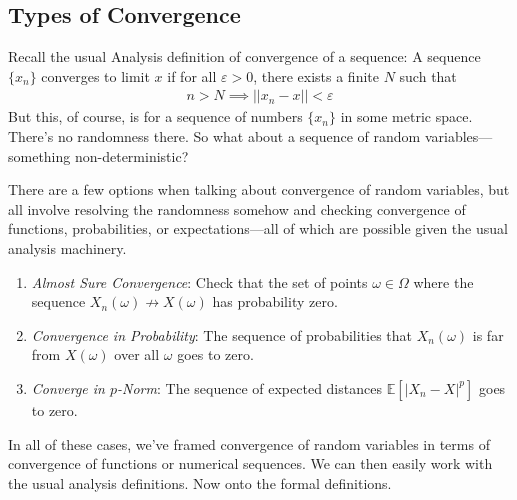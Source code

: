 \documentclass[12pt]{article}
\theoremstyle{plain}
\theoremstyle{definition}
\theoremstyle{remark}
\newcommand{\ra}{\rightarrow}
\newcommand{\E}{\mathbb{E}}
\begin{document}
\subsection{Types of Convergence}

Recall the usual Analysis definition of convergence of a sequence: A
sequence $\{x_n\}$ converges to limit $x$ if for all $\varepsilon> 0$,
there exists a finite $N$ such that
\begin{align*}
  n > N \implies ||x_n - x|| < \varepsilon
\end{align*}
But this, of course, is for a sequence of numbers $\{x_n\}$ in some
metric space. There's no randomness there. So what about a sequence of
random variables---something non-deterministic?

There are a few options when talking about convergence of random
variables, but all involve resolving the randomness somehow and checking
convergence of functions, probabilities, or expectations---all of which
are possible given the usual analysis machinery.
\begin{enumerate}
  \item \emph{Almost Sure Convergence}: Check that the set of points
    $\omega\in\Omega$ where the sequence $X_n(\omega)\not\ra
    X(\omega)$ has probability zero.
  \item \emph{Convergence in Probability}: The sequence of probabilities
    that $X_n(\omega)$ is far from $X(\omega)$ over all $\omega$ goes to
    zero.
  \item \emph{Converge in $p$-Norm}: The sequence of expected distances
    $\E[|X_n-X|^p]$ goes to zero.
\end{enumerate}
In all of these cases, we've framed convergence of random variables in
terms of convergence of functions or numerical sequences. We can then
easily work with the usual analysis definitions. Now onto the formal
definitions.
\end{document}
